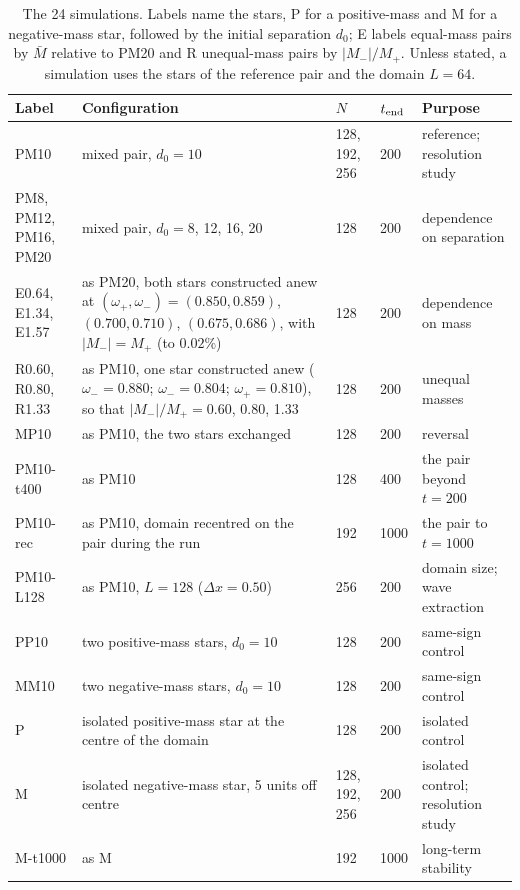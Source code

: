 \documentclass[twocolumn,floatfix,aps,prd,superscriptaddress,nofootinbib]{revtex4-2}
\begin{document}
\begin{table}[t]
\caption{The 24 simulations. Labels name the stars, P for a positive-mass and M for a negative-mass star, followed by the initial separation $d_0$; E labels equal-mass pairs by $\bar M$ relative to PM20 and R unequal-mass pairs by $|M_-|/M_+$. Unless stated, a simulation uses the stars of the reference pair and the domain $L=64$.}
\label{tab:matrix}
\begin{ruledtabular}
\begin{tabular}{lp{}lll}
Label & Configuration & $N$ & $t_{\rm end}$ & Purpose \\
\hline
PM10 & mixed pair, $d_0=10$ & 128, 192, 256 & 200 & reference; resolution study \\
PM8, PM12, PM16, PM20 & mixed pair, $d_0=8$, 12, 16, 20 & 128 & 200 & dependence on separation \\
E0.64, E1.34, E1.57 & as PM20, both stars constructed anew at $(\omega_+,\omega_-)=(0.850,0.859)$, $(0.700,0.710)$, $(0.675,0.686)$, with $|M_-|=M_+$ (to $0.02\%$) & 128 & 200 & dependence on mass \\
R0.60, R0.80, R1.33 & as PM10, one star constructed anew ($\omega_-=0.880$; $\omega_-=0.804$; $\omega_+=0.810$), so that $|M_-|/M_+=0.60$, 0.80, 1.33 & 128 & 200 & unequal masses \\
MP10 & as PM10, the two stars exchanged & 128 & 200 & reversal \\
PM10-t400 & as PM10 & 128 & 400 & the pair beyond $t=200$ \\
PM10-rec & as PM10, domain recentred on the pair during the run & 192 & 1000 & the pair to $t=1000$ \\
PM10-L128 & as PM10, $L=128$ ($\Delta x=0.50$) & 256 & 200 & domain size; wave extraction \\
\hline
PP10 & two positive-mass stars, $d_0=10$ & 128 & 200 & same-sign control \\
MM10 & two negative-mass stars, $d_0=10$ & 128 & 200 & same-sign control \\
P & isolated positive-mass star at the centre of the domain & 128 & 200 & isolated control \\
M & isolated negative-mass star, 5 units off centre & 128, 192, 256 & 200 & isolated control; resolution study \\
M-t1000 & as M & 192 & 1000 & long-term stability \\
\end{tabular}
\end{ruledtabular}
\end{table}
\end{document}
